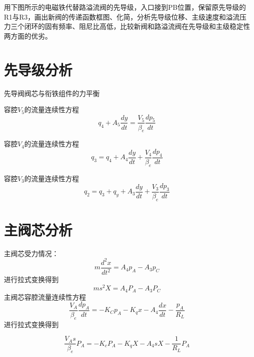 用下图所示的电磁铁代替路溢流阀的先导级，入口接到PB位置，保留原先导级的R1与R3，画出新阀的传递函数框图、化简，分析先导级位移、主级速度和溢流压力三个闭环的固有频率、阻尼比高低，比较新阀和路溢流阀在先导级和主级稳定性两方面的优劣。

\section{先导级分析}
先导阀阀芯与衔铁组件的力平衡

容腔$V_5$的流量连续性方程
\begin{equation}
    q_4 + A_5\frac{dy}{dt} = \frac{V_5}{\beta_e}\frac{dp_5}{dt}
\end{equation}

容腔$V_4$的流量连续性方程
\begin{equation}
    q_3 =q_4 + A_4\frac{dy}{dt} + \frac{V_4}{\beta_e}\frac{dp_4}{dt}
\end{equation}

容腔$V_3$的流量连续性方程
\begin{equation}
    q_2 =q_3 + q_y + A_3\frac{dy}{dt} + \frac{V_3}{\beta_e}\frac{dp_3}{dt}
\end{equation}


\section{主阀芯分析}
主阀芯受力情况：
\begin{equation}
    m\frac{d^2 x}{dt^2} = A_4p_A-A_3p_C
\end{equation}
进行拉式变换得到
\begin{equation}
    ms^2X = A_4P_A-A_3P_C
\end{equation}
主阀芯容腔流量连续性方程
\begin{equation}
    \frac{V_A}{\beta_e}\frac{dp_A}{dt} = -K_Cp_A-K_qx-A_4\frac{dx}{dt}-\frac{p_A}{R_L}
\end{equation}
进行拉式变换得到

\begin{equation}
    \frac{V_As}{\beta_e}P_A = -K_cP_A-K_qX-A_4sX-\frac{1}{R_L}P_A
\end{equation}

